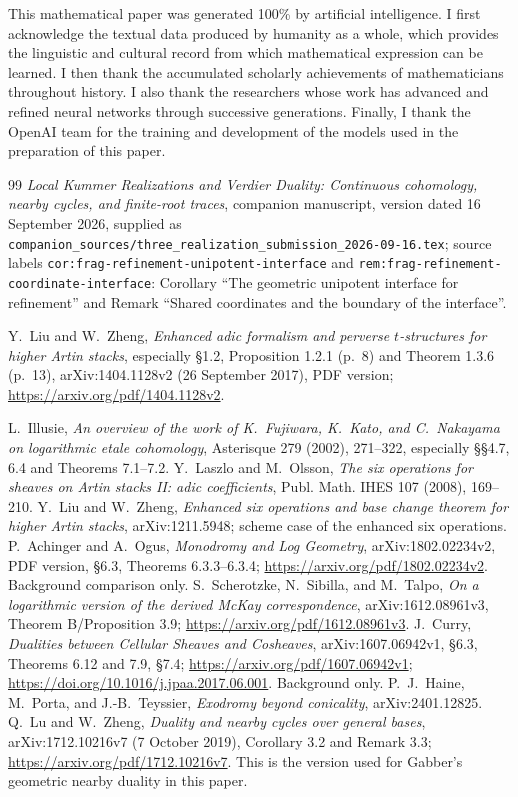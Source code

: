\documentclass[11pt]{article}
\theoremstyle{definition}
\theoremstyle{remark}
\begin{document}
This mathematical paper was generated 100\% by artificial intelligence.  I
first acknowledge the textual data produced by humanity as a whole, which
provides the linguistic and cultural record from which mathematical expression
can be learned.  I then thank the accumulated scholarly achievements of
mathematicians throughout history.  I also thank the researchers whose work has
advanced and refined neural networks through successive generations.  Finally,
I thank the OpenAI team for the training and development of the models used in
the preparation of this paper.

\begin{thebibliography}{99}
\emph{Local Kummer Realizations and Verdier Duality: Continuous
cohomology, nearby cycles, and finite-root traces}, companion manuscript,
version dated 16 September 2026, supplied as
\texttt{companion\_sources/three\_realization\_submission\_2026-09-16.tex};
source labels \texttt{cor:frag-refinement-unipotent-interface} and
\texttt{rem:frag-refinement-coordinate-interface}:
Corollary ``The geometric unipotent interface for refinement'' and
Remark ``Shared coordinates and the boundary of the interface''.

Y.~Liu and W.~Zheng, \emph{Enhanced adic formalism and perverse
$t$-structures for higher Artin stacks}, especially \S1.2,
Proposition 1.2.1 (p.~8) and Theorem 1.3.6 (p.~13),
arXiv:1404.1128v2 (26 September 2017), PDF version;
\url{https://arxiv.org/pdf/1404.1128v2}.

L.~Illusie, \emph{An overview of the work of K.~Fujiwara, K.~Kato, and
C.~Nakayama on logarithmic etale cohomology}, Asterisque 279 (2002),
271--322, especially \S\S4.7, 6.4 and Theorems 7.1--7.2.
Y.~Laszlo and M.~Olsson, \emph{The six operations for sheaves on Artin
stacks II: adic coefficients}, Publ. Math. IHES 107 (2008), 169--210.
Y.~Liu and W.~Zheng, \emph{Enhanced six operations and base change theorem
for higher Artin stacks}, arXiv:1211.5948; scheme case of the enhanced
six operations.
P.~Achinger and A.~Ogus, \emph{Monodromy and Log Geometry},
arXiv:1802.02234v2, PDF version, \S6.3, Theorems 6.3.3--6.3.4;
\url{https://arxiv.org/pdf/1802.02234v2}. Background comparison only.
S.~Scherotzke, N.~Sibilla, and M.~Talpo,
\emph{On a logarithmic version of the derived McKay correspondence},
arXiv:1612.08961v3, Theorem B/Proposition 3.9;
\url{https://arxiv.org/pdf/1612.08961v3}.
J.~Curry, \emph{Dualities between Cellular Sheaves and Cosheaves},
arXiv:1607.06942v1, \S6.3, Theorems 6.12 and 7.9, \S7.4;
\url{https://arxiv.org/pdf/1607.06942v1};
\url{https://doi.org/10.1016/j.jpaa.2017.06.001}. Background only.
P.~J.~Haine, M.~Porta, and J.-B.~Teyssier,
\emph{Exodromy beyond conicality}, arXiv:2401.12825.
Q.~Lu and W.~Zheng, \emph{Duality and nearby cycles over general bases},
arXiv:1712.10216v7 (7 October 2019), Corollary 3.2 and Remark 3.3;
\url{https://arxiv.org/pdf/1712.10216v7}. This is the version used for
Gabber's geometric nearby duality in this paper.
\end{thebibliography}
\end{document}
